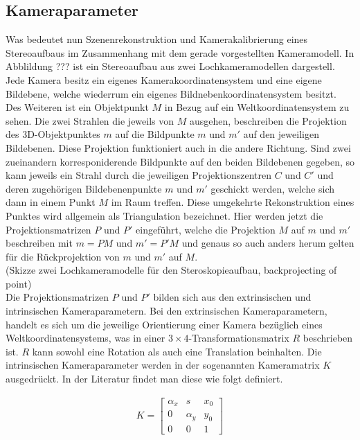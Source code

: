 \subsection{Kameraparameter}

Was bedeutet nun Szenenrekonstruktion und Kamerakalibrierung eines Stereoaufbaus im Zusammenhang mit dem gerade vorgestellten Kameramodell. In Abblildung ??? ist ein Stereoaufbau aus zwei Lochkameramodellen dargestell. Jede Kamera besitz ein eigenes Kamerakoordinatensystem und eine eigene Bildebene, welche wiederrum ein eigenes Bildnebenkoordinatensystem besitzt. Des Weiteren ist ein Objektpunkt $M$ in Bezug auf ein Weltkoordinatensystem zu sehen. Die zwei Strahlen die jeweils von $M$ ausgehen, beschreiben die Projektion des 3D-Objektpunktes $m$ auf die Bildpunkte $m$ und $m'$ auf den jeweiligen Bildebenen. Diese Projektion funktioniert auch in die andere Richtung. Sind zwei zueinandern korresponiderende Bildpunkte auf den beiden Bildebenen gegeben, so kann jeweils ein Strahl durch die jeweiligen Projektionszentren $C$ und $C'$ und deren zugehörigen Bildebenenpunkte $m$ und $m'$ geschickt werden, welche sich dann in einem Punkt $M$ im Raum treffen. Diese umgekehrte Rekonstruktion eines Punktes  wird allgemein als Triangulation bezeichnet\cite{HZ}. Hier werden jetzt die Projektionsmatrizen $P$ und $P'$ eingeführt, welche die Projektion $M$ auf $m$ und $m'$ beschreiben mit $m = PM$ und $m' = P'M$ und genaus so auch anders herum gelten für die Rückprojektion von $m$ und $m'$ auf $M$\cite{CamerModels.,HZ}.\\


(Skizze zwei Lochkameramodelle für den Steroskopieaufbau, backprojecting of point)\\


Die Projektionsmatrizen $P$ und $P'$ bilden sich aus den extrinsischen und intrinsischen Kameraparametern. Bei den extrinsischen Kameraparametern, handelt es sich um die jeweilige Orientierung einer Kamera bezüglich eines Weltkoordinatensystems, was in einer $3\times 4$-Transformationsmatrix $R$ beschrieben ist. $R$ kann sowohl eine Rotation als auch eine Translation beinhalten. Die intrinsischen Kameraparameter werden in der sogenannten Kameramatrix $K$ ausgedrückt. In der Literatur findet man diese wie folgt definiert\cite{HZ}.

\begin{gather}
K=\begin{bmatrix}
\alpha_x&s&x_{0}\\
0&\alpha_y&y_{0}\\
0&0&1
\end{bmatrix}
\end{gather}\\

